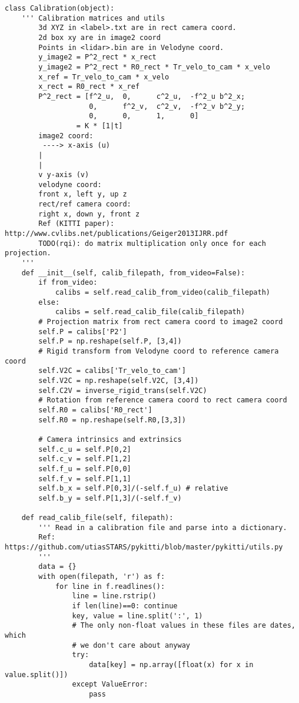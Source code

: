 \begin{verbatim}
class Calibration(object):
    ''' Calibration matrices and utils
        3d XYZ in <label>.txt are in rect camera coord.
        2d box xy are in image2 coord
        Points in <lidar>.bin are in Velodyne coord.
        y_image2 = P^2_rect * x_rect
        y_image2 = P^2_rect * R0_rect * Tr_velo_to_cam * x_velo
        x_ref = Tr_velo_to_cam * x_velo
        x_rect = R0_rect * x_ref
        P^2_rect = [f^2_u,  0,      c^2_u,  -f^2_u b^2_x;
                    0,      f^2_v,  c^2_v,  -f^2_v b^2_y;
                    0,      0,      1,      0]
                 = K * [1|t]
        image2 coord:
         ----> x-axis (u)
        |
        |
        v y-axis (v)
        velodyne coord:
        front x, left y, up z
        rect/ref camera coord:
        right x, down y, front z
        Ref (KITTI paper): http://www.cvlibs.net/publications/Geiger2013IJRR.pdf
        TODO(rqi): do matrix multiplication only once for each projection.
    '''
    def __init__(self, calib_filepath, from_video=False):
        if from_video:
            calibs = self.read_calib_from_video(calib_filepath)
        else:
            calibs = self.read_calib_file(calib_filepath)
        # Projection matrix from rect camera coord to image2 coord
        self.P = calibs['P2'] 
        self.P = np.reshape(self.P, [3,4])
        # Rigid transform from Velodyne coord to reference camera coord
        self.V2C = calibs['Tr_velo_to_cam']
        self.V2C = np.reshape(self.V2C, [3,4])
        self.C2V = inverse_rigid_trans(self.V2C)
        # Rotation from reference camera coord to rect camera coord
        self.R0 = calibs['R0_rect']
        self.R0 = np.reshape(self.R0,[3,3])

        # Camera intrinsics and extrinsics
        self.c_u = self.P[0,2]
        self.c_v = self.P[1,2]
        self.f_u = self.P[0,0]
        self.f_v = self.P[1,1]
        self.b_x = self.P[0,3]/(-self.f_u) # relative 
        self.b_y = self.P[1,3]/(-self.f_v)

    def read_calib_file(self, filepath):
        ''' Read in a calibration file and parse into a dictionary.
        Ref: https://github.com/utiasSTARS/pykitti/blob/master/pykitti/utils.py
        '''
        data = {}
        with open(filepath, 'r') as f:
            for line in f.readlines():
                line = line.rstrip()
                if len(line)==0: continue
                key, value = line.split(':', 1)
                # The only non-float values in these files are dates, which
                # we don't care about anyway
                try:
                    data[key] = np.array([float(x) for x in value.split()])
                except ValueError:
                    pass


\end{verbatim}
